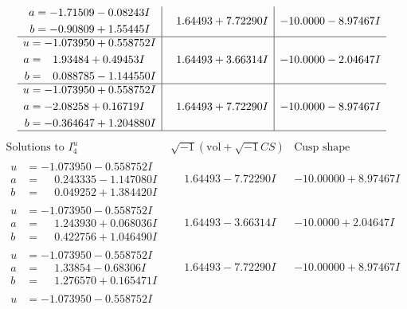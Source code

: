 \documentclass[1p]{elsarticle_modified}
\theoremstyle{definition}
\newcommand{\I}{\sqrt{-1}}
\begin{document}
$$\begin{array}{c|c|c}
\begin{aligned}
a &= -1.71509 - 0.08243 I \\
b &= -0.90809 + 1.55445 I\end{aligned}
 & \phantom{-}1.64493 + 7.72290 I & -10.0000 - 8.97467 I \\ \hline\begin{aligned}
u &= -1.073950 + 0.558752 I \\
a &= \phantom{-}1.93484 + 0.49453 I \\
b &= \phantom{-}0.088785 - 1.144550 I\end{aligned}
 & \phantom{-}1.64493 + 3.66314 I & -10.0000 - 2.04647 I \\ \hline\begin{aligned}
u &= -1.073950 + 0.558752 I \\
a &= -2.08258 + 0.16719 I \\
b &= -0.364647 + 1.204880 I\end{aligned}
 & \phantom{-}1.64493 + 7.72290 I & -10.0000 - 8.97467 I\\
 \hline 
 \end{array}$$\newpage$$\begin{array}{c|c|c}  
\text{Solutions to }I^u_{4}& \I (\text{vol} + \sqrt{-1}CS) & \text{Cusp shape}\\
 \hline 
\begin{aligned}
u &= -1.073950 - 0.558752 I \\
a &= \phantom{-}0.243335 - 1.147080 I \\
b &= \phantom{-}0.049252 + 1.384420 I\end{aligned}
 & \phantom{-}1.64493 - 7.72290 I & -10.00000 + 8.97467 I \\ \hline\begin{aligned}
u &= -1.073950 - 0.558752 I \\
a &= \phantom{-}1.243930 + 0.068036 I \\
b &= \phantom{-}0.422756 + 1.046490 I\end{aligned}
 & \phantom{-}1.64493 - 3.66314 I & -10.0000 + 2.04647 I \\ \hline\begin{aligned}
u &= -1.073950 - 0.558752 I \\
a &= \phantom{-}1.33854 - 0.68306 I \\
b &= \phantom{-}1.276570 + 0.165471 I\end{aligned}
 & \phantom{-}1.64493 - 7.72290 I & -10.00000 + 8.97467 I \\ \hline\begin{aligned}
u &= -1.073950 - 0.558752 I \\

\end{aligned}
\end{array}$$
\end{document}
